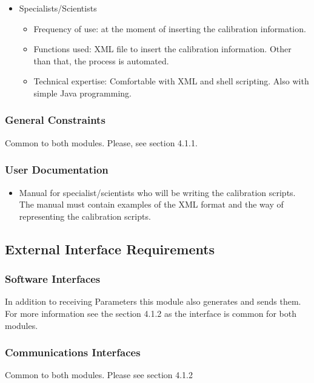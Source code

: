 \begin{itemize}
\item Specialists/Scientists
\begin{itemize}
\item Frequency of use: at the moment of inserting the calibration information.
\item Functions used: XML file to insert the calibration information. Other than that, the process is automated.
\item Technical expertise: Comfortable with XML and shell scripting. Also with simple Java programming.
\end{itemize}
\end{itemize}


\subsubsection{General Constraints}

Common to both modules. Please, see section 4.1.1.

\subsubsection{User Documentation}
\begin{itemize}
\item Manual for specialist/scientists who will be writing the calibration scripts. The manual must contain examples of the XML format and the way of representing the calibration scripts.
\end{itemize}

\subsection{External Interface Requirements}

\subsubsection{Software Interfaces}

In addition to receiving Parameters this module also generates and sends them. For more information see the section 4.1.2 as the interface is common for both modules.


\subsubsection{Communications Interfaces}

Common to both modules. Please see section 4.1.2

